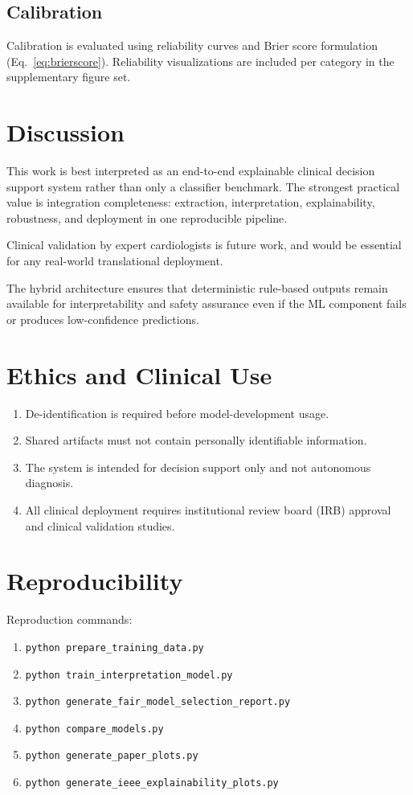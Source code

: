\documentclass[10pt,twocolumn,letterpaper]{IEEEtran}
\begin{document}
\subsection{Calibration}
Calibration is evaluated using reliability curves and Brier score formulation (Eq.~\ref{eq:brierscore}). Reliability visualizations are included per category in the supplementary figure set.



\section{Discussion}
This work is best interpreted as an end-to-end explainable clinical decision support system rather than only a classifier benchmark. The strongest practical value is integration completeness: extraction, interpretation, explainability, robustness, and deployment in one reproducible pipeline.

Clinical validation by expert cardiologists is future work, and would be essential for any real-world translational deployment.

The hybrid architecture ensures that deterministic rule-based outputs remain available for interpretability and safety assurance even if the ML component fails or produces low-confidence predictions.

\section{Ethics and Clinical Use}
\begin{enumerate}
\item De-identification is required before model-development usage.
\item Shared artifacts must not contain personally identifiable information.
\item The system is intended for decision support only and not autonomous diagnosis.
\item All clinical deployment requires institutional review board (IRB) approval and clinical validation studies.
\end{enumerate}

\section{Reproducibility}
Reproduction commands:
\begin{enumerate}
\item \texttt{python prepare\_training\_data.py}
\item \texttt{python train\_interpretation\_model.py}
\item \texttt{python generate\_fair\_model\_selection\_report.py}
\item \texttt{python compare\_models.py}
\item \texttt{python generate\_paper\_plots.py}
\item \texttt{python generate\_ieee\_explainability\_plots.py}
\end{enumerate}
\end{document}
